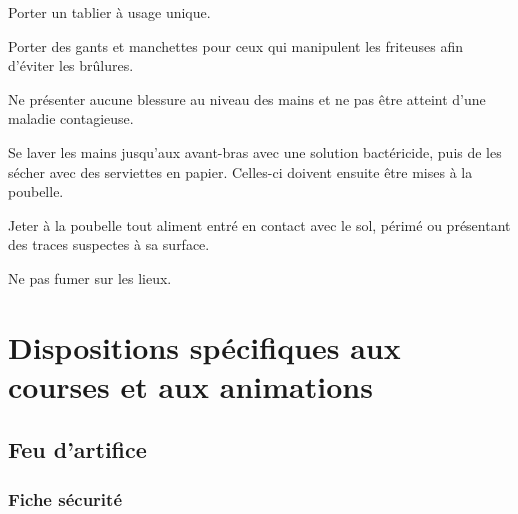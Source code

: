 \documentclass[hidelinks, paper=a4, fontsize=13pt]{report}
\begin{document}
\begin{list}{•}{}
	\item Porter un tablier à usage unique.
	\item Porter des gants et manchettes pour ceux qui manipulent les friteuses afin d’éviter les brûlures.
	\item Ne présenter aucune blessure au niveau des mains et ne pas être atteint d’une maladie contagieuse.
	\item Se laver les mains jusqu’aux avant-bras avec une solution bactéricide, puis de les sécher avec des serviettes en papier. Celles-ci doivent ensuite être mises à la poubelle.
	\item Jeter à la poubelle tout aliment entré en contact avec le sol, périmé ou présentant des traces suspectes à sa surface.  
	\item Ne pas fumer sur les lieux.
\end{list}

\newpage


\chapter{ Dispositions spécifiques aux courses et aux animations}
\section{Feu d’artifice}
\subsection{Fiche sécurité}
\end{document}
